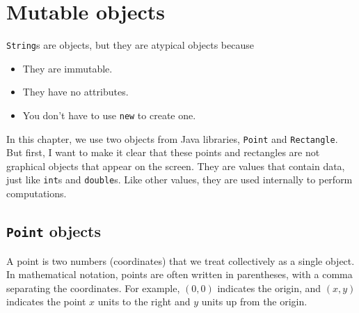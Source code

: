 \chapter{Mutable objects}
\label{chap08}
\label{objects}



{\tt String}s are objects, but they are atypical objects
because

\begin{itemize}

\item They are immutable.

\item They have no attributes.

\item You don't have to use {\tt new} to create one.

\end{itemize}

In this chapter, we use two objects from Java libraries,
 {\tt Point} and {\tt Rectangle}.
But first, I want to make it clear that these points
and rectangles are not graphical objects that appear on the
screen.  They are values that contain data, just like {\tt int}s
and {\tt double}s.  Like other values, they are used internally
to perform computations.






\section{{\tt Point} objects}

A point is two numbers (coordinates)
that we treat collectively as a single object.  In mathematical
notation, points are often written in parentheses, with a comma
separating the coordinates.  For example, $(0, 0)$ indicates
the origin, and $(x, y)$ indicates the point $x$ units to the
right and $y$ units up from the origin.

